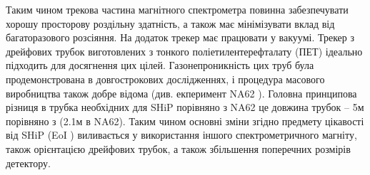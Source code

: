 	Таким чином трекова частина магнітного спектрометра повинна забезпечувати хорошу просторову роздільну здатність, а також має мінімізувати вклад від багаторазового розсіяння. На додаток трекер має працювати у вакуумі. Трекер з дрейфових трубок виготовлених з тонкого поліетилентерефталату (ПЕТ) ідеально підходить для досягнення цих цілей. Газонепроникність цих труб була продемонстрована в довгострокових дослідженнях, і процедура масового виробництва також добре відома (див. екперимент NA62 \cite{NA62_TDR}). Головна принципова різниця в трубка необхідних для SHiP порівняно з NA62 це довжина трубок -- 5м порівняно з (2.1м в NA62). Таким чином основні зміни згідно предмету цікавості від SHiP (EoI \cite{EoI}) виливається у використання іншого спектрометричного магніту, також орієнтацією дрейфових трубок, а також збільшення поперечних розмірів детектору.
	
	